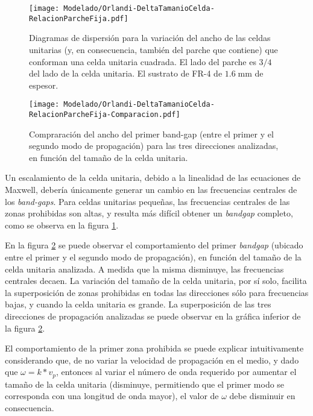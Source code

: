 \begin{figure}[h]
	\centering
	\texttt{[image: Modelado/Orlandi-DeltaTamanioCelda-RelacionParcheFija.pdf]}
	\caption{Diagramas de dispersión para la variación del ancho de las celdas unitarias (y, en consecuencia, también del parche que contiene) que conforman una celda unitaria cuadrada. El lado del parche es $3/4$ del lado de la celda unitaria. El sustrato de FR-4 de $1.6\;\text{mm}$ de espesor.}
	\label{fig:diagdisp-orlandi-variacion-tam-celda-unitaria}
\end{figure}

\begin{figure}[h]
	\centering
	\texttt{[image: Modelado/Orlandi-DeltaTamanioCelda-RelacionParcheFija-Comparacion.pdf]}
	\caption{Compraración del ancho del primer band-gap (entre el primer y el segundo modo de propagación) para las tres direcciones analizadas, en función del tamaño de la celda unitaria.}
	\label{fig:comparacion-diagdisp-orlandi-variacion-tam-celda-unitaria}
\end{figure}

Un escalamiento de la celda unitaria, debido a la linealidad de las ecuaciones de Maxwell, debería únicamente generar un cambio en las frecuencias centrales de los \textit{band-gaps}. Para celdas unitarias pequeñas, las frecuencias centrales de las zonas prohibidas son altas, y resulta más difícil obtener un \textit{bandgap} completo, como se observa en la figura \ref{fig:diagdisp-orlandi-variacion-tam-celda-unitaria}.

En la figura \ref{fig:comparacion-diagdisp-orlandi-variacion-tam-celda-unitaria} se puede observar el comportamiento del primer \textit{bandgap} (ubicado entre el primer y el segundo modo de propagación), en función del tamaño de la celda unitaria analizada. A medida que la misma disminuye, las frecuencias centrales decaen. La variación del tamaño de la celda unitaria, por sí solo, facilita la superposición de zonas prohibidas en todas las direcciones sólo para frecuencias bajas, y cuando la celda unitaria es grande. La superposición de las tres direcciones de propagación analizadas se puede observar en la gráfica inferior de la figura \ref{fig:comparacion-diagdisp-orlandi-variacion-tam-celda-unitaria}.

El comportamiento de la primer zona prohibida se puede explicar intuitivamente considerando que, de no variar la velocidad de propagación en el medio, y dado que $\omega =k*v_p$, entonces al variar el número de onda requerido por aumentar el tamaño de la celda unitaria (disminuye, permitiendo que el primer modo se corresponda con una longitud de onda mayor), el valor de $\omega$ debe disminuir en consecuencia.

